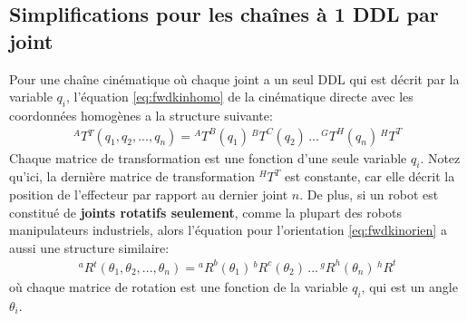 \subsection{Simplifications pour les chaînes à 1 DDL par joint}
%
Pour une chaîne cinématique où chaque joint a un seul DDL qui est décrit par la variable $q_i$, l'équation \eqref{eq:fwdkinhomo} de la cinématique directe avec les coordonnées homogènes a la structure suivante:
\begin{align}
{}^AT{}^T(q_1, q_2, ..., q_n) = {}^AT^B(q_1) \,  {}^BT^C(q_2) \, ... \, {}^GT^H(q_n) \, {}^HT^T
\end{align}
Chaque matrice de transformation est une fonction d'une seule variable $q_i$. Notez qu’ici, la dernière matrice de transformation ${}^HT^T$ est constante, car elle décrit la position de l'effecteur par rapport au dernier joint $n$.
%
De plus, si un robot est constitué de \textbf{joints rotatifs seulement}, comme la plupart des robots manipulateurs industriels, alors l'équation pour l'orientation \eqref{eq:fwdkinorien} a aussi une structure similaire:
\begin{align}
{}^aR{}^t(\theta_1, \theta_2, ..., \theta_n) =  {}^aR^b(\theta_1) \,  {}^bR^c(\theta_2) \, ... \, {}^gR^h(\theta_n) \, {}^hR^t
\end{align}
où chaque matrice de rotation est une fonction de la variable $q_i$, qui est un angle $\theta_i$.

